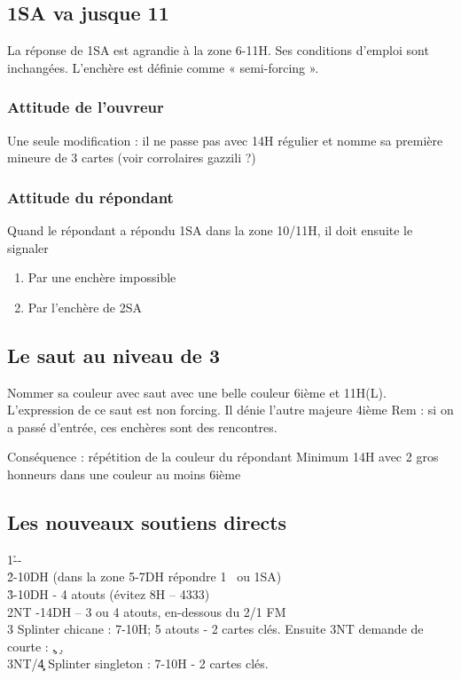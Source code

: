 \documentclass[a4paper]{article}
\begin{document}
\subsection{1SA va jusque 11}

La réponse de 1SA est agrandie à la zone 6-11H. 
Ses conditions d’emploi sont inchangées. 
L’enchère est définie comme « semi-forcing ».

\subsubsection{Attitude de l'ouvreur}

Une seule modification : il ne passe pas avec 14H régulier et nomme sa 
première mineure de 3 cartes (voir corrolaires gazzili ?)

\subsubsection{Attitude du répondant}

Quand le répondant a répondu 1SA dans la zone 10/11H, il doit ensuite 
le signaler

\begin{enumerate}
\item Par une enchère impossible

\item Par l’enchère de 2SA

\end{enumerate}

\subsection{Le saut au niveau de 3}

Nommer sa couleur avec saut avec une belle couleur 6ième et 11H(L). 
L’expression de ce saut est non forcing. Il dénie l’autre majeure 4ième
Rem : si on a passé d’entrée, ces enchères sont des rencontres.

Conséquence : répétition de la couleur du répondant
Minimum 14H avec 2 gros honneurs dans une couleur au moins 6ième

\subsection{Les nouveaux soutiens directs}

\begin{bidtable}
1\h--\\
2\h {}-10DH (dans la zone 5-7DH répondre 1 \s\ ou 1SA)\\
3\h {}-10DH - 4 atouts (évitez 8H – 4333)\\
2NT -14DH – 3 ou 4 atouts, en-dessous du 2/1 FM\\
3\s \> Splinter chicane : 7-10H; 5 atouts - 2 cartes clés. Ensuite 3NT demande de courte : \c , \d , \s \\
3NT/4\c\d \> Splinter singleton : 7-10H - 2 cartes clés.
\end{bidtable}
\end{document}
